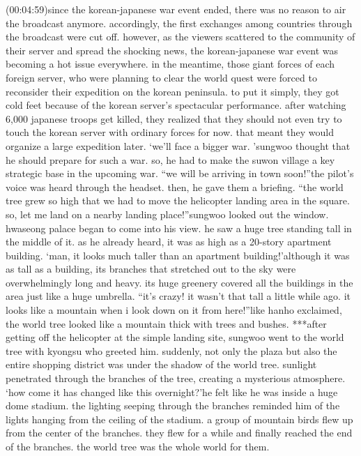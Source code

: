  (00:04:59)since the korean-japanese war event ended, there was no reason to air the broadcast anymore.
 accordingly, the first exchanges among countries through the broadcast were cut off.
however, as the viewers scattered to the community of their server and spread the shocking news, the korean-japanese war event was becoming a hot issue everywhere.
in the meantime, those giant forces of each foreign server, who were planning to clear the world quest were forced to reconsider their expedition on the korean peninsula.
to put it simply, they got cold feet because of the korean server’s spectacular performance.
after watching 6,000 japanese troops get killed, they realized that they should not even try to touch the korean server with ordinary forces for now.
 that meant they would organize a large expedition later.
‘we’ll face a bigger war.
’sungwoo thought that he should prepare for such a war.
 so, he had to make the suwon village a key strategic base in the upcoming war.
“we will be arriving in town soon!”the pilot’s voice was heard through the headset.
then, he gave them a briefing.
“the world tree grew so high that we had to move the helicopter landing area in the square.
 so, let me land on a nearby landing place!”sungwoo looked out the window.
 hwaseong palace began to come into his view.
 he saw a huge tree standing tall in the middle of it.
 as he already heard, it was as high as a 20-story apartment building.
‘man, it looks much taller than an apartment building!’although it was as tall as a building, its branches that stretched out to the sky were overwhelmingly long and heavy.
its huge greenery covered all the buildings in the area just like a huge umbrella.
“it’s crazy! it wasn’t that tall a little while ago.
 it looks like a mountain when i look down on it from here!”like hanho exclaimed, the world tree looked like a mountain thick with trees and bushes.
***after getting off the helicopter at the simple landing site, sungwoo went to the world tree with kyongsu who greeted him.
suddenly, not only the plaza but also the entire shopping district was under the shadow of the world tree.
sunlight penetrated through the branches of the tree, creating a mysterious atmosphere.
‘how come it has changed like this overnight?’he felt like he was inside a huge dome stadium.
 the lighting seeping through the branches reminded him of the lights hanging from the ceiling of the stadium.
a group of mountain birds flew up from the center of the branches.
 they flew for a while and finally reached the end of the branches.
 the world tree was the whole world for them.


